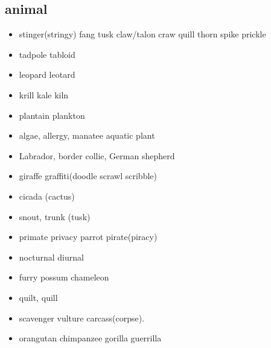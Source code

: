 \documentclass[a4paper,11pt,twoside]{book}
\begin{document}
\subsection{animal}
\begin{itemize}
	\item stinger(stringy) fang tusk claw/talon craw quill thorn spike prickle
	
	\item tadpole tabloid
	
	\item leopard leotard
	
	\item krill kale kiln 
	
	\item plantain plankton
	
	\item algae, allergy, manatee aquatic plant
	
	\item Labrador, border collie, German shepherd
	\item giraffe graffiti(doodle scrawl scribble) 
	
	\item cicada (cactus)
	
	\item snout, trunk (tusk)
	
	\item primate privacy parrot pirate(piracy)
		
	\item nocturnal diurnal
		
	\item furry possum chameleon 
	
	\item quilt, quill
	
	\item scavenger vulture carcass(corpse).
	
	\item orangutan chimpanzee gorilla guerrilla 
\end{itemize}
\end{document}
